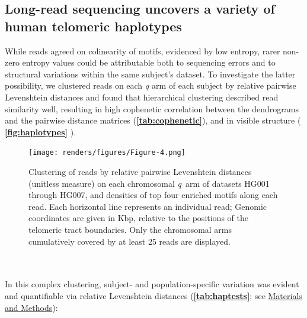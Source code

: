 \documentclass{article}
\begin{document}
\subsection*{Long-read sequencing uncovers a variety of human telomeric haplotypes}
    While reads agreed on colinearity of motifs, evidenced by low entropy,
        rarer non-zero entropy values could be attributable both to sequencing errors
        and to structural variations within the same subject's dataset.
    To investigate the latter possibility,
        we clustered reads on each \textit{q} arm of each subject by relative pairwise Levenshtein distances \cite{levenshtein}
        and found that hierarchical clustering described read similarity well,
            resulting in high cophenetic correlation between the dendrograms and the pairwise distance matrices
                (\textbf{\autoref{tab:cophenetic}}),
            and in visible structure (
                \textbf{\autoref{fig:haplotypes}} %
            ).
                \begin{figure}[h!] \centering %
                \texttt{[image: renders/figures/Figure-4.png]} %
                \caption{ %
                    \small Clustering of reads by relative pairwise Levenshtein distances (unitless measure) %
                    on each chromosomal \mbox{\textit{q} arm} of datasets HG001 through HG007, %
                    and densities of top four enriched motifs along each read. %
                    Each horizontal line represents an individual read; %
                    Genomic coordinates are given in Kbp, relative to the positions of the telomeric tract boundaries. %
                    Only the chromosomal arms cumulatively covered by at least 25 reads are displayed. %
                } %
                \label{fig:haplotypes} %
                \end{figure} %
    ~\\~\\
    In this complex clustering, subject- and population-specific variation was evident and quantifiable via relative Levenshtein distances
        (\textbf{\autoref{tab:haptests}}; see \hyperref[sec:methods]{Materials and Methods}):
\end{document}
